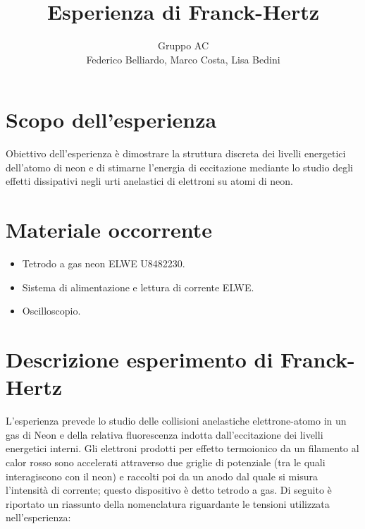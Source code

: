 \documentclass[10pt,a4paper]{article}
\author{Gruppo AC \\ Federico Belliardo, Marco Costa, Lisa Bedini}
\title{Esperienza di Franck-Hertz}
\begin{document}
\maketitle



\section{Scopo dell'esperienza}
Obiettivo dell'esperienza è dimostrare la struttura discreta dei livelli energetici dell'atomo di neon e di stimarne l'energia di eccitazione mediante lo studio degli effetti dissipativi negli urti anelastici di elettroni su atomi di neon.

\section{Materiale occorrente}
\begin{itemize}
\item Tetrodo a gas neon ELWE U8482230.
\item Sistema di alimentazione e lettura di corrente ELWE.
\item Oscilloscopio.
\end{itemize}

\section{Descrizione esperimento di Franck-Hertz}
L'esperienza prevede lo studio delle collisioni anelastiche elettrone-atomo in un gas di Neon e della relativa fluorescenza indotta dall'eccitazione dei livelli energetici interni. Gli elettroni prodotti per effetto termoionico da un filamento al calor rosso sono accelerati attraverso due griglie di potenziale (tra le quali interagiscono con il neon) e raccolti poi da un anodo dal quale si misura l'intensità di corrente; questo dispositivo è detto tetrodo a gas.
Di seguito è riportato un riassunto della nomenclatura riguardante le tensioni utilizzata nell'esperienza:
\end{document}
